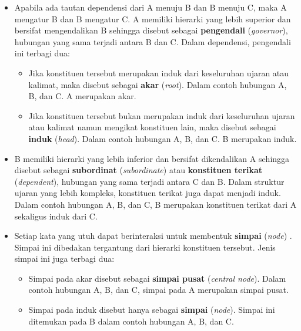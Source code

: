 \begin{itemize}
\item Apabila ada tautan dependensi dari A menuju B dan B menuju C, maka A mengatur B dan B mengatur C. A memiliki hierarki yang lebih superior dan bersifat mengendalikan B sehingga disebut sebagai \textbf{pengendali} (\textit{governor}), hubungan yang sama terjadi antara B dan C. Dalam dependensi, pengendali ini terbagi dua:
\begin{itemize} 
\item Jika konstituen tersebut merupakan induk dari keseluruhan ujaran atau kalimat, maka disebut sebagai \textbf{akar} (\textit{root}). Dalam contoh hubungan A, B, dan C. A merupakan akar.
\item Jika konstituen tersebut bukan merupakan induk dari keseluruhan ujaran atau kalimat namun mengikat konstituen lain, maka disebut sebagai \textbf{induk} (\textit{head}). Dalam contoh hubungan A, B, dan C. B merupakan induk.
\end{itemize}
\item B memiliki hierarki yang lebih inferior dan bersifat dikendalikan A sehingga disebut sebagai \textbf{subordinat} (\textit{subordinate}) atau \textbf{konstituen terikat} (\textit{dependent}), hubungan yang sama terjadi antara C dan B. Dalam struktur ujaran yang lebih kompleks, konstituen terikat juga dapat menjadi induk. Dalam contoh hubungan A, B, dan C, B merupakan konstituen terikat dari A sekaligus induk dari C.
\item Setiap kata yang utuh dapat berinteraksi untuk membentuk \textbf{simpai} (\textit{node}) \citep{tesniere1959elements}. Simpai ini dibedakan tergantung dari hierarki konstituen tersebut. Jenis simpai ini juga terbagi dua:
\begin{itemize}
\item Simpai pada akar disebut sebagai \textbf{simpai pusat} (\textit{central node}). Dalam contoh hubungan A, B, dan C, simpai pada A merupakan simpai pusat.
\item Simpai pada induk disebut hanya sebagai \textbf{simpai} (\textit{node}). Simpai ini ditemukan pada B dalam contoh hubungan A, B, dan C.
\end{itemize}
\end{itemize}

